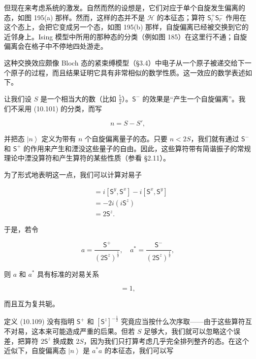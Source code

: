 但现在来考虑系统的激发。自然而然的设想是，它们对应于单个自旋发生偏离的态，如图 195(a) 那样。然而，这样的态并不是 $\mathcal{H}$ 的本征态；算符 $\mathsf{S}_l^{+}\mathsf{S}_{l'}^{-}$ 作用在这个态上，会把它变成另一个态，如图 195(b) 那样，自旋偏离已经被交换到它的近邻身上。Ising 模型中所用的那种态的分类（例如图 185）在这里行不通；自旋偏离会在格子中不停地四处游走。

这种交换效应颇像 Bloch 态的紧束缚模型（§3.4）中电子从一个原子被递交给下一个原子的过程，而且结果证明它具有非常相似的数学性质。这一效应的数学表述如下。

让我们设 $S$ 是一个相当大的数（比如 $\frac{5}{2}$）。$\mathsf{S}^{-}$ 的效果是“产生一个自旋偏离”。我们不采用 (10.101) 的分类，而写

\begin{equation*}
n = S - S',
\tag{10.107}
\end{equation*}

并把态 $\left|n\right\rangle$ 定义为带有 $n$ 个自旋偏离量子的态。只要 $n < 2S$，我们就有通过 $\mathsf{S}^{-}$ 和 $\mathsf{S}^{+}$ 的作用来产生和湮没这些量子的自由。因此，这些算符带有简谐振子的常规理论中湮没算符和产生算符的某些性质（参看 §2.11）。

为了形式地表明这一点，我们可以计算对易子

\begin{align*}
[\mathsf{S}^{+},\mathsf{S}^{-}] &= i[\mathsf{S}^{y},\mathsf{S}^{x}] - i[\mathsf{S}^{x},\mathsf{S}^{y}]\\
&= -2i(i\mathsf{S}^z)\\
&= 2\mathsf{S}^z.
\tag{10.108}
\end{align*}

于是，若令

\begin{equation*}
a = \frac{\mathsf{S}^{+}}{(2\mathsf{S}^z)^{\frac{1}{2}}}, \quad a^{*} = \frac{\mathsf{S}^{-}}{(2\mathsf{S}^z)^{\frac{1}{2}}},
\tag{10.109}
\end{equation*}

则 $a$ 和 $a^{*}$ 具有标准的对易关系

\begin{equation*}
[a, a^{*}] = 1,
\tag{10.110}
\end{equation*}

而且互为复共轭。

定义 (10.109) 没有指明 $\mathsf{S}^{+}$ 和 $[\mathsf{S}^z]^{-\frac{1}{2}}$ 究竟应当按什么次序取——由于这些算符互不对易，这本来可能造成严重的后果。但若 $S$ 足够大，我们就可以忽略这个误差，把算符 $2\mathsf{S}^z$ 换成数 $2S$，因为我们只打算考虑几乎完全排列整齐的态。在这个近似下，自旋偏离态 $\left|n\right\rangle$ 是 $a^{*}a$ 的本征态，我们可以写

